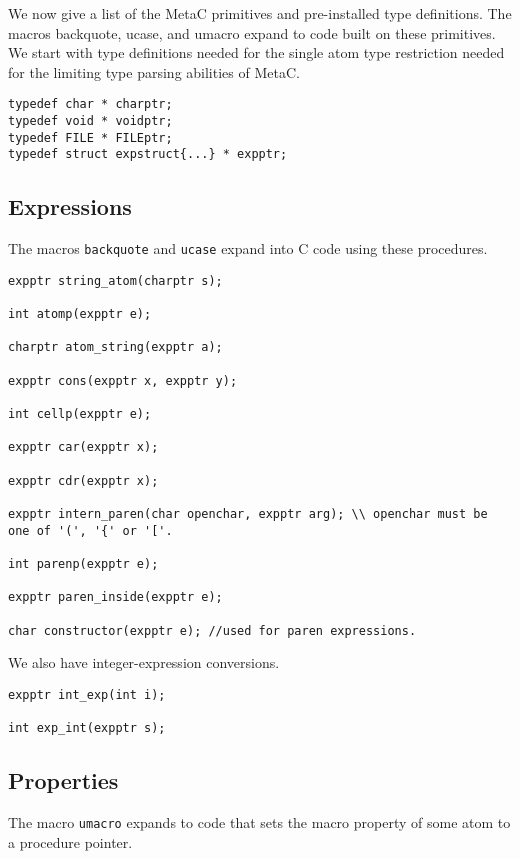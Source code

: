 \documentclass{article}
\begin{document}
We now give a list of the MetaC primitives and pre-installed type definitions.  The macros backquote, ucase, and umacro expand to code built on these primitives.
We start with type definitions needed for the single atom type restriction needed for the limiting type parsing abilities of MetaC.

\begin{verbatim}
typedef char * charptr;
typedef void * voidptr;
typedef FILE * FILEptr;
typedef struct expstruct{...} * expptr;
\end{verbatim}

\subsection{Expressions}

The macros {\tt backquote} and {\tt ucase} expand into C code using these procedures.

\begin{verbatim}
expptr string_atom(charptr s);

int atomp(expptr e);

charptr atom_string(expptr a);

expptr cons(expptr x, expptr y);

int cellp(expptr e);

expptr car(expptr x);

expptr cdr(expptr x);

expptr intern_paren(char openchar, expptr arg); \\ openchar must be one of '(', '{' or '['.

int parenp(expptr e);

expptr paren_inside(expptr e);

char constructor(expptr e); //used for paren expressions.
\end{verbatim}

We also have integer-expression conversions.

\begin{verbatim}
expptr int_exp(int i);

int exp_int(expptr s);
\end{verbatim}

\subsection{Properties}

The macro {\tt umacro} expands to code that
sets the macro property of some atom to a procedure pointer.
\end{document}
